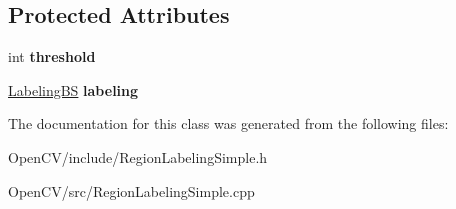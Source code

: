 \subsection*{Protected Attributes}
\begin{DoxyCompactItemize}
\item 
\hypertarget{classskl_1_1_region_labeling_simple_ad169a11ec06edf1e100fb4df948b2aca}{}\label{classskl_1_1_region_labeling_simple_ad169a11ec06edf1e100fb4df948b2aca} 
int {\bfseries threshold}
\item 
\hypertarget{classskl_1_1_region_labeling_simple_ad8f7567dc7b8d87ceda74b68c0686ce2}{}\label{classskl_1_1_region_labeling_simple_ad8f7567dc7b8d87ceda74b68c0686ce2} 
\hyperlink{class_labeling}{Labeling\+BS} {\bfseries labeling}
\end{DoxyCompactItemize}


The documentation for this class was generated from the following files\+:\begin{DoxyCompactItemize}
\item 
Open\+C\+V/include/Region\+Labeling\+Simple.\+h\item 
Open\+C\+V/src/Region\+Labeling\+Simple.\+cpp\end{DoxyCompactItemize}
